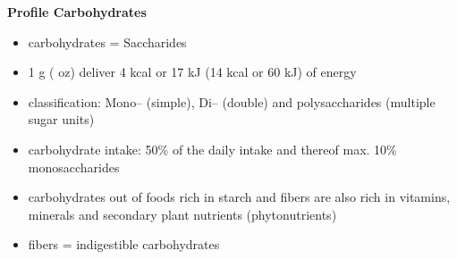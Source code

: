 \documentclass[../main.tex]{subfiles}
\begin{document}
 
\vspace{5mm}
\noindent
\begin{fminipage}{\textwidth}
  \textbf{Profile Carbohydrates}
  \begin{itemize}
  \item carbohydrates = Saccharides
  \item 1 g ( oz) deliver 4 kcal or 17 kJ (14 kcal or 60 kJ) of energy
  \item classification: Mono-- (simple), Di-- (double) and polysaccharides (multiple sugar units)
  \item carbohydrate intake: 50\% of the daily intake and thereof max. 10\% monosaccharides
  \item carbohydrates out of foods rich in starch and fibers are also rich in vitamins, minerals and secondary plant nutrients (phytonutrients)
    \item fibers = indigestible carbohydrates
  \end{itemize}
\end{fminipage}
\end{document}

